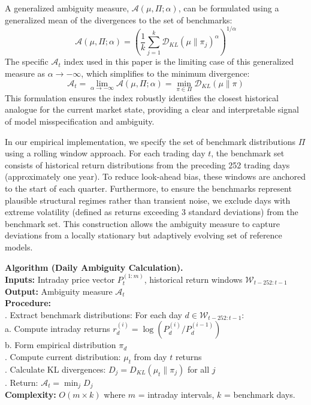 \documentclass[preprint,12pt,authoryear]{elsarticle}
\begin{document}
A generalized ambiguity measure, $\mathcal{A}(\mu, \Pi; \alpha)$, can be formulated using a generalized mean of the divergences to the set of benchmarks:
\begin{equation}
    \mathcal{A}(\mu, \Pi; \alpha) = \left( \frac{1}{k} \sum_{j=1}^{k} \mathcal{D}_{KL}(\mu \| \pi_j)^{\alpha} \right)^{1/\alpha}
\end{equation}
The specific $\mathcal{A}_t$ index used in this paper is the limiting case of this generalized measure as $\alpha \to -\infty$, which simplifies to the minimum divergence:
\begin{equation}
    \mathcal{A}_t = \lim_{\alpha \to -\infty} \mathcal{A}(\mu, \Pi; \alpha) = \min_{\pi \in \Pi} \mathcal{D}_{KL}(\mu \| \pi)
\end{equation}
This formulation ensures the index robustly identifies the closest historical analogue for the current market state, providing a clear and interpretable signal of model misspecification and ambiguity.

In our empirical implementation, we specify the set of benchmark distributions $\Pi$ using a rolling window approach. For each trading day $t$, the benchmark set consists of historical return distributions from the preceding 252 trading days (approximately one year). To reduce look-ahead bias, these windows are anchored to the start of each quarter. Furthermore, to ensure the benchmarks represent plausible structural regimes rather than transient noise, we exclude days with extreme volatility (defined as returns exceeding 3 standard deviations) from the benchmark set. This construction allows the ambiguity measure to capture deviations from a locally stationary but adaptively evolving set of reference models.

\vspace{\baselineskip}
\noindent

\textbf{Algorithm (Daily Ambiguity Calculation).}\\
\textbf{Inputs:} Intraday price vector $P_{t}^{(1:m)}$, historical return windows $\mathcal{W}_{t-252:t-1}$\\
\textbf{Output:} Ambiguity measure $\mathcal{A}_t$\\
\textbf{Procedure:}\\
. Extract benchmark distributions: For each day $d \in \mathcal{W}_{t-252:t-1}$:\\
\indent\indent a. Compute intraday returns $r^{(i)}_d = \log(P^{(i)}_d/P^{(i-1)}_d)$\\
\indent\indent b. Form empirical distribution $\pi_d$\\
. Compute current distribution: $\mu_t$ from day $t$ returns\\
. Calculate KL divergences: $D_j = D_{KL}(\mu_t \| \pi_j)$ for all $j$\\
. Return: $\mathcal{A}_t = \min_j D_j$\\
\textbf{Complexity:} $O(m \times k)$ where $m$ = intraday intervals, $k$ = benchmark days.
\end{document}
